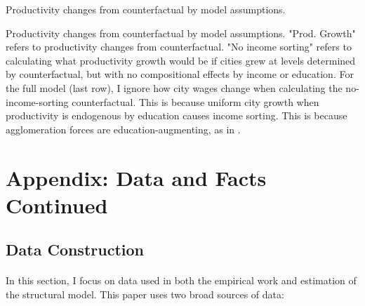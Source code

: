 \documentclass[12pt]{article}
\begin{document}
	
	\begin{center}
		\centering
		
		\begin{table}[htbp]
				\caption{Productivity changes from counterfactual by model assumptions.}\label{table:LabourProdDifCtfls}
				\makebox[\textwidth]{	 }
				\caption*{Productivity changes from counterfactual by model assumptions. "Prod. Growth" refers to productivity changes from counterfactual. "No income sorting" refers to calculating what productivity growth would be if cities grew at levels determined by counterfactual, but with no compositional effects by income or education. For the full model (last row), I ignore how city wages change when calculating the no-income-sorting counterfactual. This is because uniform city growth when productivity is endogenous by education causes income sorting. This is because agglomeration forces are education-augmenting, as in \cite{ineqincreased}.}
			
		\end{table}
		
		
	\end{center}

	
	\clearpage
	
	
	\appendix
	\normalsize
	\section{Appendix: Data and Facts Continued}\label{DataandFactsContinued}
	
	\subsection{Data Construction} \label{Appendix:DataConstruction}
	\paragraph*{}
 In this section, I focus on data used in both the empirical work and estimation of the structural model. This paper uses two broad sources of data: 
	
\end{document}
